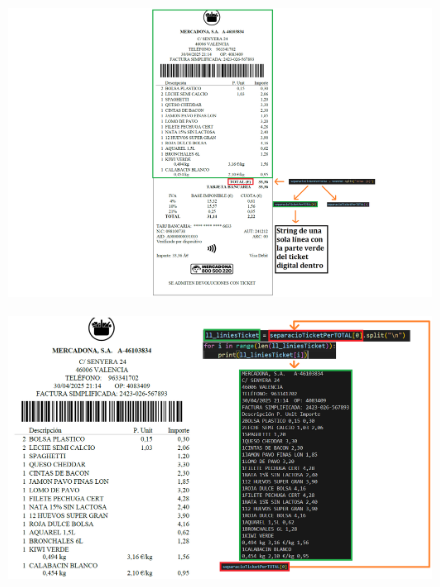 \documentclass{beamer}
\begin{document}
		\begin{frame}
			\begin{figure}
				\centering
				\includegraphics[width=1\linewidth]{imgEspecifiques/ticketExtraccioF.png}
				\label{fig:ticketExtraccioF}
			\end{figure}
		\end{frame}
		
		\begin{frame}
			\begin{figure}
				\centering
				\includegraphics[width=1\linewidth]{imgEspecifiques/ticketExtraccioG.png}
				\label{fig:ticketExtraccioG}
			\end{figure}
		\end{frame}
		
	
				
\end{document}
